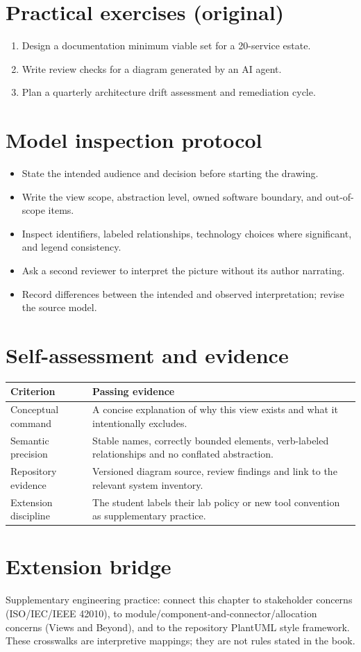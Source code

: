\documentclass[10pt,letterpaper]{article}
\begin{document}
\section{Practical exercises (original)}
\begin{enumerate}
\item Design a documentation minimum viable set for a 20-service estate.
\item Write review checks for a diagram generated by an AI agent.
\item Plan a quarterly architecture drift assessment and remediation cycle.
\end{enumerate}

\section{Model inspection protocol}
\begin{itemize}
\item State the intended audience and decision before starting the drawing.
\item Write the view scope, abstraction level, owned software boundary, and out-of-scope items.
\item Inspect identifiers, labeled relationships, technology choices where significant, and legend consistency.
\item Ask a second reviewer to interpret the picture without its author narrating.
\item Record differences between the intended and observed interpretation; revise the source model.
\end{itemize}

\section{Self-assessment and evidence}
\begin{tabularx}{\linewidth}{@{}YY@{}}\toprule
\textbf{Criterion} & \textbf{Passing evidence} \\ \midrule
Conceptual command & A concise explanation of why this view exists and what it intentionally excludes. \\
Semantic precision & Stable names, correctly bounded elements, verb-labeled relationships and no conflated abstraction. \\
Repository evidence & Versioned diagram source, review findings and link to the relevant system inventory. \\
Extension discipline & The student labels their lab policy or new tool convention as supplementary practice. \\
\bottomrule\end{tabularx}


\section{Extension bridge}
Supplementary engineering practice: connect this chapter to stakeholder concerns (ISO/IEC/IEEE 42010), to module/component-and-connector/allocation concerns (Views and Beyond), and to the repository PlantUML style framework. These crosswalks are interpretive mappings; they are not rules stated in the book.
\end{document}
